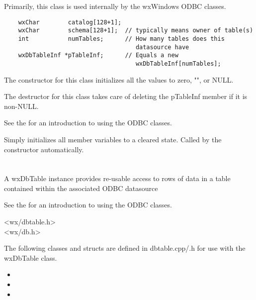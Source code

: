 Primarily, this class is used internally by the wxWindows ODBC classes.

\begin{verbatim}
    wxChar        catalog[128+1];
    wxChar        schema[128+1];  // typically means owner of table(s)
    int           numTables;      // How many tables does this
                                     datasource have
    wxDbTableInf *pTableInf;      // Equals a new
                                     wxDbTableInf[numTables];
\end{verbatim}

The constructor for this class initializes all the values to zero, "", or NULL.

The destructor for this class takes care of deleting the pTableInf member if
it is non-NULL.

See the  for
an introduction to using the ODBC classes.

\label{wxdbinfinitialize}

Simply initializes all member variables to a cleared state.  Called by
the constructor automatically.

\section{}\label{wxdbtable}

A wxDbTable instance provides re-usable access to rows of data in
a table contained within the associated ODBC datasource

See the  for
an introduction to using the ODBC classes.


<wx/dbtable.h>\\
<wx/db.h>


The following classes and structs are defined in dbtable.cpp/.h for use
with the wxDbTable class.

\begin{itemize}\itemsep=0pt
\item {}
\item {}
\item {}
\end{itemize}

